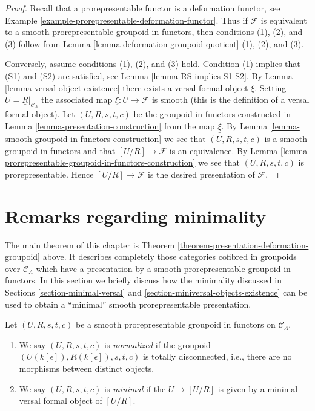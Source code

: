 \begin{proof}
Recall that a prorepresentable functor is a deformation functor, see
Example \ref{example-prorepresentable-deformation-functor}. Thus
if $\mathcal{F}$ is equivalent to a smooth prorepresentable groupoid in
functors, then conditions (1), (2), and (3) follow from
Lemma \ref{lemma-deformation-groupoid-quotient} (1), (2), and (3).

\medskip\noindent
Conversely, assume conditions (1), (2), and (3) hold. Condition (1)
implies that (S1) and (S2) are satisfied, see
Lemma \ref{lemma-RS-implies-S1-S2}.
By
Lemma \ref{lemma-versal-object-existence}
there exists a versal formal object $\xi$. Setting
$U = \underline{R}|_{\mathcal{C}_\Lambda}$ the
associated map $\underline{\xi} : U \to \mathcal{F}$ is smooth (this is
the definition of a versal formal object).
Let $(U, R, s, t, c)$ be the groupoid in functors constructed in
Lemma \ref{lemma-presentation-construction}
from the map $\underline{\xi}$. By
Lemma \ref{lemma-smooth-groupoid-in-functors-construction}
we see that $(U, R, s, t, c)$ is a smooth groupoid in functors and that
$[U/R] \to \mathcal{F}$ is an equivalence. By
Lemma \ref{lemma-prorepresentable-groupoid-in-functors-construction}
we see that $(U, R, s, t, c)$ is prorepresentable.
Hence $[U/R] \to \mathcal{F}$ is the desired presentation of $\mathcal{F}$.
\end{proof}








\section{Remarks regarding minimality}
\label{section-minimality}

\noindent
The main theorem of this chapter is
Theorem \ref{theorem-presentation-deformation-groupoid}
above. It describes completely those categories cofibred in groupoids
over $\mathcal{C}_\Lambda$ which have a presentation by a
smooth prorepresentable groupoid in functors. In this section we briefly
discuss how the minimality discussed in
Sections \ref{section-minimal-versal} and
\ref{section-miniversal-objects-existence}
can be used to obtain a ``minimal'' smooth prorepresentable presentation.

\begin{definition}
\label{definition-minimal-groupoid-in-functors}
Let $(U, R, s, t, c)$ be a smooth prorepresentable groupoid in functors
on $\mathcal{C}_\Lambda$.
\begin{enumerate}
\item We say $(U, R, s, t, c)$ is {\it normalized} if the groupoid
$(U(k[\epsilon]), R(k[\epsilon]), s, t, c)$ is totally disconnected,
i.e., there are no morphisms between distinct objects.
\item We say $(U, R, s, t, c)$ is {\it minimal} if the $U \to [U/R]$
is given by a minimal versal formal object of $[U/R]$.
\end{enumerate}
\end{definition}

